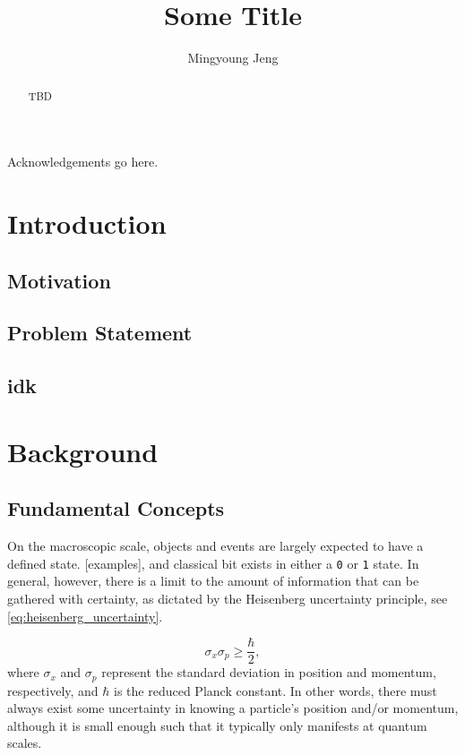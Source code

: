 \documentclass[12pt,english,letterpaper]{kuthesis}
\title{Some Title}
\author{Mingyoung Jeng}
\begin{document}
\begin{romanpages}
	\maketitle
	
	\begin{abstract}
		TBD
	\end{abstract}

	\begin{acknowledgementslong}
		Acknowledgements go here.
	\end{acknowledgementslong}

	\tableofcontents{}
	\listoffigures
	\listoftables
\end{romanpages}

\chapter{Introduction}

\section{Motivation}



\section{Problem Statement}
\section{idk}
\chapter{Background}

\section{Fundamental Concepts}
On the macroscopic scale, objects and events are largely expected to have a defined state. [examples], and classical bit exists in either a \texttt{0} or \texttt{1} state.
In general, however, there is a limit to the amount of information that can be gathered with certainty, as dictated by the Heisenberg uncertainty principle, see \eqref{eq:heisenberg_uncertainty}.

\begin{equation}
	\sigma_x \sigma_p \geq \frac{\hbar}{2},
\label{eq:heisenberg_uncertainty}
\end{equation}
where $\sigma_x$ and $\sigma_p$ represent the standard deviation in position and momentum, respectively, and $\hbar$ is the reduced Planck constant. In other words, there must always exist some uncertainty in knowing a particle's position and/or momentum, although it is small enough such that it typically only manifests at quantum scales.
\end{document}

